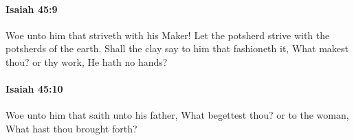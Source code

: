 		\paragraph{Isaiah 45:9} %
			\label{ISAIAH-45-9}

			Woe unto him that striveth with his Maker! Let the potsherd strive with the potsherds of the earth. Shall the clay say to him that fashioneth it, What makest thou? or thy work, He hath no hands?


		\paragraph{Isaiah 45:10} %
			\label{ISAIAH-45-10}

			Woe unto him that saith unto his father, What begettest thou? or to the woman, What hast thou brought forth?


